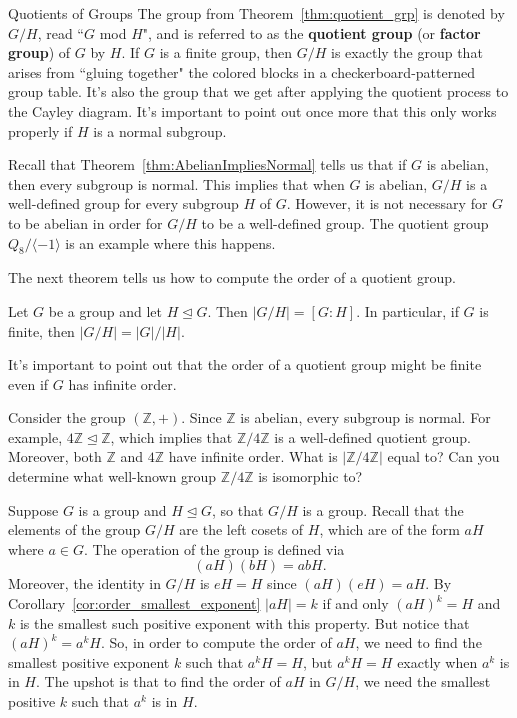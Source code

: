 \begin{section}{Quotients of Groups}
The group from Theorem~\ref{thm:quotient_grp} is denoted by $G/H$, read ``$G$ mod $H$", and is referred to as the \textbf{quotient group} (or \textbf{factor group}) of $G$ by $H$.  If $G$ is a finite group, then $G/H$ is exactly the group that arises from ``gluing together" the colored blocks in a checkerboard-patterned group table.  It's also the group that we get after applying the quotient process to the Cayley diagram.  It's important to point out once more that this only works properly if $H$ is a normal subgroup.

Recall that Theorem~\ref{thm:AbelianImpliesNormal} tells us that if $G$ is abelian, then every subgroup is normal.  This implies that when $G$ is abelian, $G/H$ is a well-defined group for every subgroup $H$ of $G$.  However, it is not necessary for $G$ to be abelian in order for $G/H$ to be a well-defined group.  The quotient group $Q_8/\langle -1\rangle$ is an example where this happens. 

The next theorem tells us how to compute the order of a quotient group.

\begin{theorem}
Let $G$ be a group and let $H\trianglelefteq G$.  Then $|G/H|=[G:H]$.  In particular, if $G$ is finite, then $|G/H|=|G|/|H|$.
\end{theorem}

It's important to point out that the order of a quotient group might be finite even if $G$ has infinite order.

\begin{problem}
Consider the group $(\mathbb{Z},+)$. Since $\mathbb{Z}$ is abelian, every subgroup is normal. For example, $4\mathbb{Z} \trianglelefteq \mathbb{Z}$, which implies that $\mathbb{Z}/4\mathbb{Z}$ is a well-defined quotient group.  Moreover, both $\mathbb{Z}$ and $4\mathbb{Z}$ have infinite order. What is $|\mathbb{Z}/4\mathbb{Z}|$ equal to?  Can you determine what well-known group $\mathbb{Z}/4\mathbb{Z}$ is isomorphic to?
\end{problem}

Suppose $G$ is a group and $H\trianglelefteq G$, so that $G/H$ is a group. Recall that the elements of the group $G/H$ are the left cosets of $H$, which are of the form $aH$ where $a\in G$. The operation of the group is defined via
\[
(aH)(bH) = abH.
\]
Moreover, the identity in $G/H$ is $eH = H$ since $(aH)(eH) = aH$. By Corollary~\ref{cor:order_smallest_exponent} $|aH| = k$ if and only $(aH)^k = H$ and $k$ is the smallest such positive exponent with this property. But notice that $(aH)^k = a^kH$. So, in order to compute the order of $aH$, we need to find the smallest positive exponent $k$ such that $a^kH = H$, but $a^kH = H$ exactly when $a^k$ is in $H$. The upshot is that to find the order of $aH$ in $G/H$, we need the smallest positive $k$ such that $a^k$ is in $H$.


\end{section}
